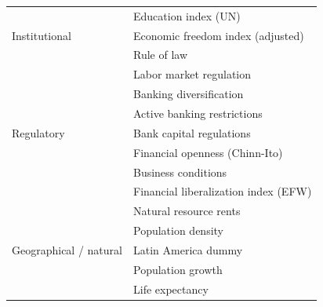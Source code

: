 \begin{refsection}
\begin{subappendices}
\begin{table}[ht!]
\begin{tabular}{ll}
      \midrule
      \multirow{3}{*}{Institutional}  & Education index (UN) \\
                    & Economic freedom index (adjusted) \\
                    & Rule of law \\
    
      \midrule
      \multirow{7}{*}{Regulatory}  & Labor market regulation \\
                    & Banking diversification \\
                    & Active banking restrictions \\
                    & Bank capital regulations \\
                    & Financial openness (Chinn-Ito) \\
                    & Business conditions \\
                    & Financial liberalization index (EFW) \\
     
      \midrule
      \multirow{5}{*}{Geographical / natural} & Natural resource rents \\
                                    & Population density \\
                                    & Latin America dummy \\
                                    & Population growth \\
                                    & Life expectancy \\
      \bottomrule
    \end{tabular}
    \end{table}
    \clearpage
    

\end{subappendices}
\end{refsection}
